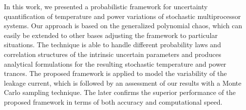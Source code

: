 In this work, we presented a probabilistic framework for uncertainty quantification of temperature and power variations of stochastic multiprocessor systems. Our approach is based on the generalized polynomial chaos, which can easily be extended to other bases adjusting the framework to particular situations. The technique is able to handle different probability laws and correlation structures of the intrinsic uncertain parameters and produces analytical formulations for the resulting stochastic temperature and power trances. The proposed framework is applied to model the variability of the leakage current, which is followed by an assessment of our results with a Monte Carlo sampling technique. The later confirms the superior performance of the proposed framework in terms of both accuracy and computational speed.
